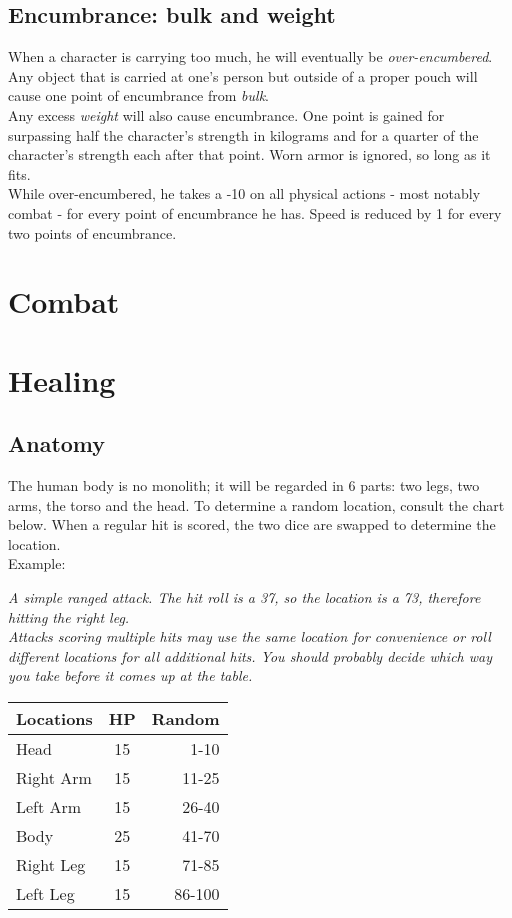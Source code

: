 \documentclass[12pt,a4paper,openany,usenames,dvipsnames]{book}
\begin{document}
	\section{Encumbrance: bulk and weight}
	When a character is carrying too much, he will eventually be \emph{over-encumbered}. Any object that is carried at one's person but outside of a proper pouch will cause one point of encumbrance from \emph{bulk}.\\
	Any excess \emph{weight} will also cause encumbrance. One point is gained for surpassing half the character’s strength in kilograms and for a quarter of the character’s strength each after that point. Worn armor is ignored, so long as it fits.\\
	While over-encumbered, he takes a -10 on all physical actions - most notably combat - for every point of encumbrance he has. Speed is reduced by 1 for every two points of encumbrance.

	\chapter{Combat}
	
	
	
	

	\chapter{Healing}
	\vspace{-10mm} %
	\section{Anatomy}
	The human body is no monolith; it will be regarded in 6 parts: two legs, two arms, the torso and the head. To determine a random location, consult the chart below. When a regular hit is scored, the two dice are swapped to determine the location.\\
	Example: 
	\begin{exampleblock}
		\itshape
		A simple ranged attack. The hit roll is a 37, so the location is a 73, therefore hitting the right leg.\\
		Attacks scoring multiple hits may use the same location for convenience or roll different locations for all additional hits. You should probably decide which way you take \emph{before} it comes up at the table.
	\end{exampleblock}
	\par
	\begin{minipage}{\columnwidth}
		\begin{tabularx}{\columnwidth}{Xcr}
			Locations & HP & Random \\ \hline
			Head      & 15 &   1-10 \\ %
			Right Arm & 15 &  11-25 \\ %
			Left Arm  & 15 &  26-40 \\ %
			Body      & 25 &  41-70 \\ %
			Right Leg & 15 &  71-85 \\ %
			Left Leg  & 15 & 86-100 \\ %
		\end{tabularx}
	\end{minipage}
\end{document}
